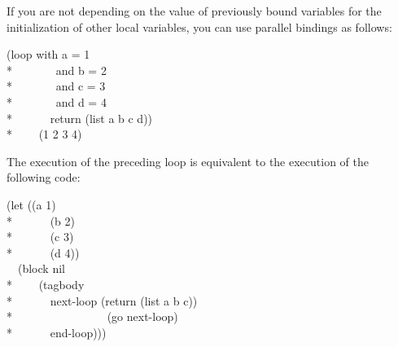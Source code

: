 If you are not depending on the value of previously bound variables
for the initialization of other local variables, you can use
parallel bindings as follows:
\begin{lisp}
(loop with a = 1  \\*
~~~~~~~and b = 2  \\*
~~~~~~~and c = 3 \\*
~~~~~~~and d = 4 \\*
~~~~~~return (list a b c d)) \\*
~~~\EV~(1 2 3 4)
\end{lisp}

The execution of the preceding loop is equivalent to the execution of
the following code:

\begin{lisp}
(let ((a 1) \\*
~~~~~~(b 2) \\*
~~~~~~(c 3) \\*
~~~~~~(d 4)) \\
~~(block nil \\*
~~~~(tagbody \\*
~~~~~~next-loop (return (list a b c)) \\*
~~~~~~~~~~~~~~~~(go next-loop) \\*
~~~~~~end-loop)))
\end{lisp}

